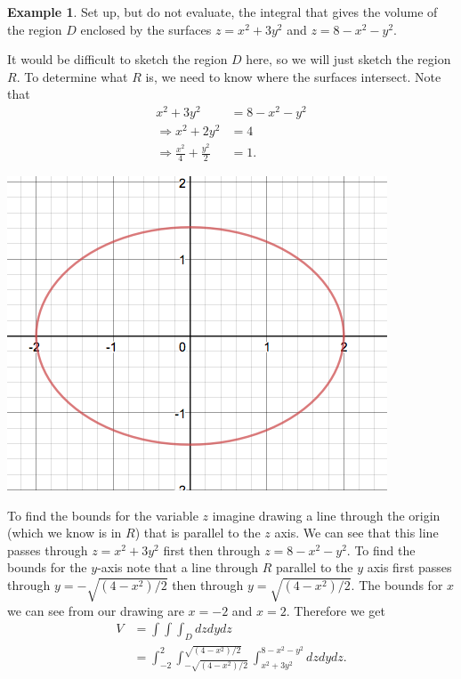 \documentclass[12pt, letter]{article}
\theoremstyle{plain}
\numberwithin{theorem}{section}
\theoremstyle{definition}
\newtheorem{example}[theorem]{Example}
\begin{document}
\begin{example}
Set up, but do not evaluate, the integral that gives the volume of the region $D$ enclosed by the surfaces $z=x^2+3y^2$ and $z=8-x^2-y^2$.

\bigskip

It would be difficult to sketch the region $D$ here, so we will just sketch the region $R$. To determine what $R$ is, we need to know where the surfaces intersect. Note that
\begin{align*}
x^2+3y^2 &= 8-x^2-y^2\\
\Rightarrow x^2+2y^2&=4\\
\Rightarrow \frac{x^2}{4}+\frac{y^2}{2} &=1.
\end{align*}

\bigskip

\begin{center}
\includegraphics[scale=0.7]{m3_f16}
\end{center}

\bigskip

To find the bounds for the variable $z$ imagine drawing a line through the origin (which we know is in $R$) that is parallel to the $z$ axis. We can see that this line passes through $z=x^2+3y^2$ first then through $z=8-x^2-y^2$. To find the bounds for the $y$-axis note that a line through $R$ parallel to the $y$ axis first passes through $y=-\sqrt{(4-x^2)/2}$ then through $y=\sqrt{(4-x^2)/2}$. The bounds for $x$ we can see from our drawing are $x=-2$ and $x=2$. Therefore we get
\begin{align*}
V &= \int \int \int_D dzdydz\\
&= \int_{-2}^2 \int_{-\sqrt{(4-x^2)/2}}^{\sqrt{(4-x^2)/2}} \int_{x^2+3y^2}^{8-x^2-y^2} dzdydz.
\end{align*}

\end{example}
\end{document}
